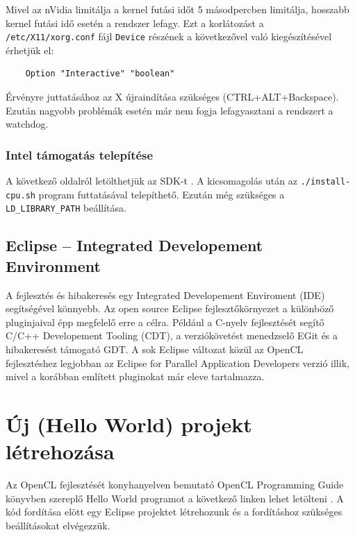 	Mivel az nVidia limitálja a kernel futási időt 5 másodpercben limitálja,
	hosszabb kernel futási idő esetén a rendszer lefagy.
	Ezt a korlátozást a \texttt{/etc/X11/xorg.conf} fájl \texttt{Device} részének a
	következővel való kiegészítésével érhetjük el:
	\begin{lstlisting}
	Option "Interactive" "boolean"
	\end{lstlisting}
	Érvényre juttatásához az X újraindítása szükséges (CTRL+ALT+Backspace).
	Ezután nagyobb problémák esetén már nem fogja lefagyasztani a rendszert a
	watchdog.

\subsubsection{Intel támogatás telepítése}
	A következő oldalról letölthetjük az SDK-t \cite{intel-sdk}.
	A kicsomagolás után az \texttt{./install-cpu.sh} program futtatásával
	telepíthető.
	Ezután még szükséges a \texttt{LD\_LIBRARY\_PATH} beállítása.

\subsection{Eclipse – Integrated Developement Environment}
	A fejlesztés és hibakeresés egy Integrated Developement Enviroment (IDE)
	segítségével könnyebb.
	Az open source Eclipse \cite{eclipse} fejlesztőkörnyezet a különböző pluginjaival épp
	megfelelő erre a célra.
	Például a C-nyelv fejlesztését segítő C/C++ Developement Tooling (CDT),
	a verziókövetést menedzselő EGit és a hibakeresést támogató GDT.
	A sok Eclipse változat közül az OpenCL fejlesztéshez legjobban az
	Eclipse for Parallel Application Developers verzió illik, mivel a korábban említett pluginokat már eleve tartalmazza.


\section{Új (Hello World) projekt létrehozása}
	Az OpenCL fejlesztését konyhanyelven bemutató OpenCL Programming Guide \cite{openclbook}
	könyvben szereplő Hello World programot a következő linken lehet letölteni
	\cite{hellow}.
	A kód fordítása elött egy Eclipse projektet létrehozunk és a
	fordításhoz szükséges beállításokat elvégezzük.

